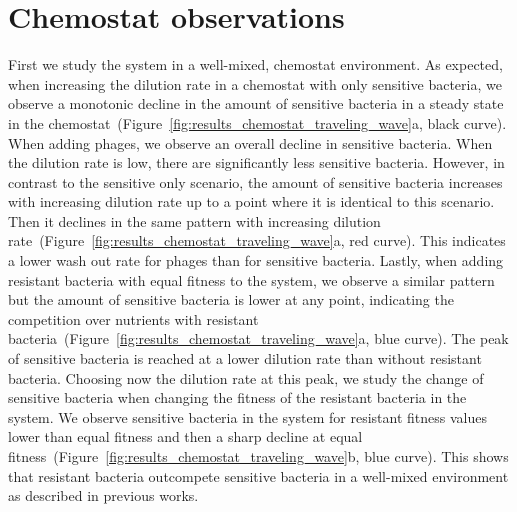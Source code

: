 \section{Chemostat observations}
First we study the system in a well-mixed, chemostat environment. As expected, when increasing the dilution rate in a chemostat with only sensitive bacteria, we observe a monotonic decline in the amount of sensitive bacteria in a steady state in the chemostat~(Figure~\ref{fig:results_chemostat_traveling_wave}a, black curve). When adding phages, we observe an overall decline in sensitive bacteria. When the dilution rate is low, there are significantly less sensitive bacteria. However, in contrast to the sensitive only scenario, the amount of sensitive bacteria increases with increasing dilution rate up to a point where it is identical to this scenario. Then it declines in the same pattern with increasing dilution rate~(Figure~\ref{fig:results_chemostat_traveling_wave}a, red curve). This indicates a lower wash out rate for phages than for sensitive bacteria. Lastly, when adding resistant bacteria with equal fitness to the system, we observe a similar pattern but the amount of sensitive bacteria is lower at any point, indicating the competition over nutrients with resistant bacteria~(Figure~\ref{fig:results_chemostat_traveling_wave}a, blue curve). The peak of sensitive bacteria is reached at a lower dilution rate than without resistant bacteria. Choosing now the dilution rate at this peak, we study the change of sensitive bacteria when changing the fitness of the resistant bacteria in the system. We observe sensitive bacteria in the system for resistant fitness values lower than equal fitness and then a sharp decline at equal fitness~(Figure~\ref{fig:results_chemostat_traveling_wave}b, blue curve). This shows that resistant bacteria outcompete sensitive bacteria in a well-mixed environment as described in previous works.
